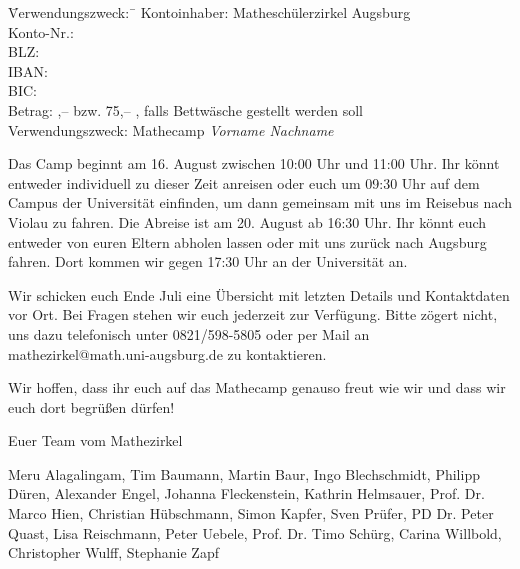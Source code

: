 \documentclass{zettel}
\begin{document}
\vspace{-0.7em}
\begin{tabbing}
  \qquad\quad \= Verwendungszweck:\, \= \kill
  \> Kontoinhaber: \> Matheschülerzirkel Augsburg \\
  \> Konto-Nr.:  \\
  \> BLZ:  \\
  \> IBAN:  \\
  \> BIC:  \\
  \> Betrag: ,-- \texteuro{} bzw. 75,-- \texteuro, falls Bettwäsche
  gestellt werden soll \\
  \> Verwendungszweck: \> Mathecamp \emph{Vorname Nachname}
\end{tabbing}
\vspace{-0.7em}

Das Camp beginnt am 16. August zwischen 10:00 Uhr und 11:00 Uhr. Ihr könnt
entweder individuell zu dieser Zeit anreisen oder euch um 09:30 Uhr auf dem Campus der
Universität einfinden, um dann gemeinsam mit uns im Reisebus nach Violau zu fahren.
Die Abreise ist am 20. August ab 16:30 Uhr. Ihr könnt euch entweder von euren
Eltern abholen lassen oder mit uns zurück nach Augsburg fahren. Dort kommen wir
gegen 17:30 Uhr an der Universität an.

Wir schicken euch Ende Juli eine Übersicht mit
letzten Details und Kontaktdaten vor Ort. Bei Fragen stehen wir euch jederzeit
zur Verfügung. Bitte zögert nicht, uns dazu telefonisch unter 0821/598-5805 oder per
Mail an \textsf{mathezirkel@math.uni-augsburg.de} zu kontaktieren.

Wir hoffen, dass ihr euch auf das Mathecamp genauso freut wie wir und dass wir
euch dort begrüßen dürfen!

\vspace{2em}

Euer Team vom Mathezirkel

Meru Alagalingam, Tim Baumann, Martin Baur, Ingo Blechschmidt, Philipp Düren,
Alexander Engel, Johanna Fleckenstein, Kathrin Helmsauer, Prof. Dr. Marco Hien,
Christian Hübschmann, Simon Kapfer, Sven Prüfer, PD Dr. Peter Quast,
Lisa Reischmann, Peter Uebele, Prof. Dr. Timo Schürg, Carina Willbold,
Christopher Wulff, Stephanie Zapf
\end{document}
